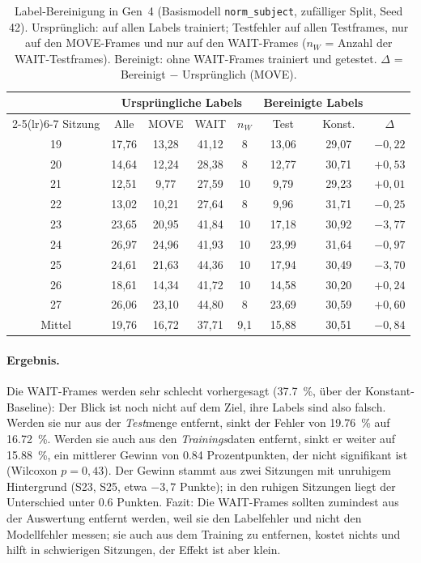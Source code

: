 \documentclass[
  11pt,
  a4paper,
  oneside,
  DIV=12,
  BCOR=8mm,
  parskip=half,
  headings=normal,
  bibliography=totoc,
  listof=totoc
]{scrreprt}
\newcommand{\code}[1]{\texttt{#1}}
\begin{document}
\begin{table}[htbp]
  \centering
  \caption{Label-Bereinigung in Gen~4 (Basismodell \code{norm\_subject},
           zufälliger Split, Seed 42). Ursprünglich: auf allen Labels
           trainiert; Testfehler auf allen Testframes, nur auf den MOVE-Frames
           und nur auf den WAIT-Frames ($n_W$ = Anzahl der WAIT-Testframes).
           Bereinigt: ohne WAIT-Frames trainiert und getestet. $\Delta$ =
           Bereinigt $-$ Ursprünglich (MOVE).}
  \label{tab:cleaning}
  \footnotesize
  \setlength{\tabcolsep}{4pt}
  \begin{tabular}{c cccc cc c}
    \toprule
    & \multicolumn{4}{c}{Ursprüngliche Labels} & \multicolumn{2}{c}{Bereinigte Labels} & \\
    \cmidrule(lr){2-5}\cmidrule(lr){6-7}
    Sitzung & Alle & MOVE & WAIT & $n_W$ & Test & Konst. & $\Delta$ \\
    \midrule
    19 & 17,76 & 13,28 & 41,12 & 8  & 13,06 & 29,07 & $-0,22$ \\
    20 & 14,64 & 12,24 & 28,38 & 8  & 12,77 & 30,71 & $+0,53$ \\
    21 & 12,51 &  9,77 & 27,59 & 10 &  9,79 & 29,23 & $+0,01$ \\
    22 & 13,02 & 10,21 & 27,64 & 8  &  9,96 & 31,71 & $-0,25$ \\
    23 & 23,65 & 20,95 & 41,84 & 10 & 17,18 & 30,92 & $-3,77$ \\
    24 & 26,97 & 24,96 & 41,93 & 10 & 23,99 & 31,64 & $-0,97$ \\
    25 & 24,61 & 21,63 & 44,36 & 10 & 17,94 & 30,49 & $-3,70$ \\
    26 & 18,61 & 14,34 & 41,72 & 10 & 14,58 & 30,20 & $+0,24$ \\
    27 & 26,06 & 23,10 & 44,80 & 8  & 23,69 & 30,59 & $+0,60$ \\
    \midrule
    Mittel & 19,76 & 16,72 & 37,71 & 9,1 & 15,88 & 30,51 & $-0,84$ \\
    \bottomrule
  \end{tabular}
\end{table}

\paragraph{Ergebnis.} Die WAIT-Frames werden sehr schlecht vorhergesagt
(\SI{37,7}{\percent}, über der Konstant-Baseline): Der Blick ist noch nicht
auf dem Ziel, ihre Labels sind also falsch. Werden sie nur aus der
\emph{Test}menge entfernt, sinkt der Fehler von \SI{19,76}{\percent} auf
\SI{16,72}{\percent}. Werden sie auch aus den \emph{Trainings}daten entfernt,
sinkt er weiter auf \SI{15,88}{\percent}, ein mittlerer Gewinn von \num{0,84}
Prozentpunkten, der nicht signifikant ist (Wilcoxon $p=0,43$). Der Gewinn
stammt aus zwei Sitzungen mit unruhigem Hintergrund (S23, S25, etwa $-3,7$
Punkte); in den ruhigen Sitzungen liegt der Unterschied unter \num{0,6}
Punkten. Fazit: Die WAIT-Frames sollten zumindest aus der Auswertung entfernt
werden, weil sie den Labelfehler und nicht den Modellfehler messen; sie auch
aus dem Training zu entfernen, kostet nichts und hilft in schwierigen
Sitzungen, der Effekt ist aber klein.
\end{document}
